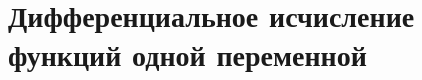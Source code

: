 \documentclass[../main.tex]{subfiles}
\begin{document}
\chapter{Дифференциальное исчисление функций одной переменной}

\end{document}
